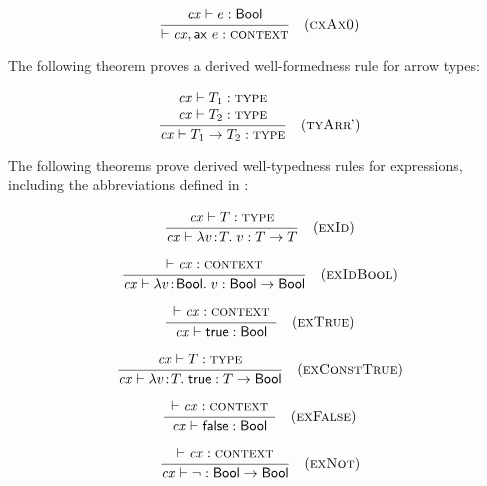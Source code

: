 \begin{theorem}\label{thm-axmono}
{\rm
\[
\rruleI
 {\hastyO{\expr}{\bool}}
 {\cxwf{\snoc{\cx}{\axM{\expr}}}}
 {\Rcxaxmono}
\]
}
\end{theorem}

The following theorem proves a derived well-formedness rule for arrow types:

\begin{theorem}\label{thm-tarrI}
{\rm
\[
\rruleII
 {\istyO{\typ_1}}
 {\istyO{\typ_2}}
 {\istyO{\tarrO}}
 {\RtarrI}
\]
}
\end{theorem}

The following theorems prove derived well-typedness rules for expressions,
including the abbreviations defined in :

\begin{theorem}\label{thm-eid}
{\rm
\[
\rruleI
 {\istyO{\typ}}
 {\hastyO{\abs{\var}{\typ}{\var}}{\tarr{\typ}{\typ}}}
 {\Reid}
\]
}
\end{theorem}

\begin{theorem}\label{thm-eidbool}
{\rm
\[
\rruleI
 {\cxwfO}
 {\hastyO{\abs{\var}{\bool}{\var}}{\tarr{\bool}{\bool}}}
 {\Reidbool}
\]
}
\end{theorem}

\begin{theorem}\label{thm-etrue}
{\rm
\[
\rruleI
 {\cxwfO}
 {\hastyO{\true}{\bool}}
 {\Retrue}
\]
}
\end{theorem}

\begin{theorem}\label{thm-econsttrue}
{\rm
\[
\rruleI
 {\istyO{\typ}}
 {\hastyO{\abs{\var}{\typ}{\true}}{\tarr{\typ}{\bool}}}
 {\Reconsttrue}
\]
}
\end{theorem}

\begin{theorem}\label{thm-efalse}
{\rm
\[
\rruleI
 {\cxwfO}
 {\hastyO{\false}{\bool}}
 {\Refalse}
\]
}
\end{theorem}

\begin{theorem}\label{thm-enot}
{\rm
\[
\rruleI
 {\cxwfO}
 {\hastyO{\negaop}{\tarr{\bool}{\bool}}}
 {\Renot}
\]
}
\end{theorem}

